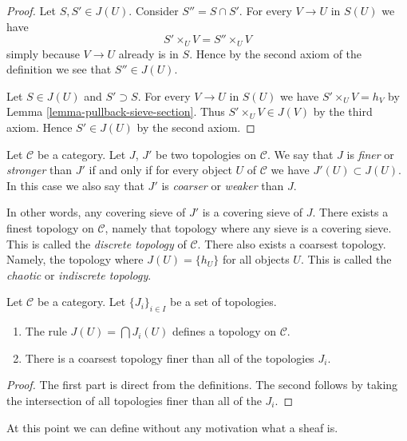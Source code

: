 \begin{proof}
Let $S, S' \in J(U)$. Consider $S'' = S \cap S'$. For every
$V \to U$ in $S(U)$ we have
$$
S' \times_U V = S'' \times_U V
$$
simply because $V \to U$ already is in $S$. Hence by the second
axiom of the definition we see that $S'' \in J(U)$.

\medskip\noindent
Let $S \in J(U)$ and $S' \supset S$. For every
$V \to U$ in $S(U)$ we have $S' \times_U V = h_V$ by
Lemma \ref{lemma-pullback-sieve-section}. Thus
$S' \times_U V \in J(V)$ by the third axiom. Hence
$S' \in J(U)$ by the second axiom.
\end{proof}

\begin{definition}
\label{definition-finer}
Let $\mathcal{C}$ be a category. Let $J$, $J'$ be
two topologies on $\mathcal{C}$. We say that $J$ is
{\it finer} or {\it stronger} than $J'$ if and only if for every object
$U$ of $\mathcal{C}$ we have $J'(U) \subset J(U)$.
In this case we also say that $J'$ is
{\it coarser} or {\it weaker} than $J$.
\end{definition}

\noindent
In other words, any covering sieve of $J'$ is a
covering sieve of $J$. There exists a finest topology
on $\mathcal{C}$, namely that topology where any sieve
is a covering sieve. This is called the
{\it discrete topology} of $\mathcal{C}$.
There also exists a coarsest topology.
Namely, the topology where $J(U) = \{h_U\}$
for all objects $U$. This is called the
{\it chaotic} or {\it indiscrete topology}.

\begin{lemma}
\label{lemma-play-with-topologies}
Let $\mathcal{C}$ be a category.
Let $\{J_i\}_{i\in I}$ be a set of topologies.
\begin{enumerate}
\item The rule $J(U) = \bigcap J_i(U)$ defines
a topology on $\mathcal{C}$.
\item There is a coarsest topology finer than
all of the topologies $J_i$.
\end{enumerate}
\end{lemma}

\begin{proof}
The first part is direct from the definitions.
The second follows by taking the intersection
of all topologies finer than all of the $J_i$.
\end{proof}

\noindent
At this point we can define
without any motivation what a sheaf is.

